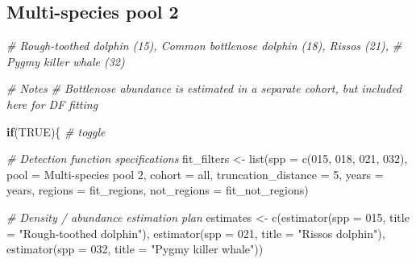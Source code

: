 \documentclass[
]{book}
\newenvironment{Shaded}{\begin{snugshade}}{\end{snugshade}}
\newcommand{\AttributeTok}[1]{\textcolor[rgb]{0.77,0.63,0.00}{#1}}
\newcommand{\CommentTok}[1]{\textcolor[rgb]{0.56,0.35,0.01}{\textit{#1}}}
\newcommand{\ConstantTok}[1]{\textcolor[rgb]{0.00,0.00,0.00}{#1}}
\newcommand{\ControlFlowTok}[1]{\textcolor[rgb]{0.13,0.29,0.53}{\textbf{#1}}}
\newcommand{\DecValTok}[1]{\textcolor[rgb]{0.00,0.00,0.81}{#1}}
\newcommand{\FunctionTok}[1]{\textcolor[rgb]{0.00,0.00,0.00}{#1}}
\newcommand{\NormalTok}[1]{#1}
\newcommand{\OtherTok}[1]{\textcolor[rgb]{0.56,0.35,0.01}{#1}}
\newcommand{\StringTok}[1]{\textcolor[rgb]{0.31,0.60,0.02}{#1}}
\begin{document}
\hypertarget{multi-species-pool-2}{%
\subsection*{Multi-species pool 2}\label{multi-species-pool-2}}

\begin{Shaded}
\begin{Highlighting}[]
\CommentTok{\# Rough{-}toothed dolphin (15), Common bottlenose dolphin (18), Risso\textquotesingle{}s (21),}
\CommentTok{\# Pygmy killer whale (32)}

\CommentTok{\# Notes}
\CommentTok{\# Bottlenose abundance is estimated in a separate cohort, but included here for DF fitting}

\ControlFlowTok{if}\NormalTok{(}\ConstantTok{TRUE}\NormalTok{)\{ }\CommentTok{\# toggle}

  \CommentTok{\# Detection function specifications}
\NormalTok{  fit\_filters }\OtherTok{\textless{}{-}}
    \FunctionTok{list}\NormalTok{(}\AttributeTok{spp =} \FunctionTok{c}\NormalTok{(}\StringTok{\textquotesingle{}015\textquotesingle{}}\NormalTok{, }\StringTok{\textquotesingle{}018\textquotesingle{}}\NormalTok{, }\StringTok{\textquotesingle{}021\textquotesingle{}}\NormalTok{, }\StringTok{\textquotesingle{}032\textquotesingle{}}\NormalTok{),}
         \AttributeTok{pool =} \StringTok{\textquotesingle{}Multi{-}species pool 2\textquotesingle{}}\NormalTok{,}
         \AttributeTok{cohort =} \StringTok{\textquotesingle{}all\textquotesingle{}}\NormalTok{,}
         \AttributeTok{truncation\_distance =} \DecValTok{5}\NormalTok{,}
         \AttributeTok{years =}\NormalTok{ years,}
         \AttributeTok{regions =}\NormalTok{ fit\_regions,}
         \AttributeTok{not\_regions =}\NormalTok{ fit\_not\_regions)}

  \CommentTok{\# Density / abundance estimation plan}
\NormalTok{  estimates }\OtherTok{\textless{}{-}}
      \FunctionTok{c}\NormalTok{(}\FunctionTok{estimator}\NormalTok{(}\AttributeTok{spp =} \StringTok{\textquotesingle{}015\textquotesingle{}}\NormalTok{, }\AttributeTok{title =} \StringTok{"Rough{-}toothed dolphin"}\NormalTok{),}
        \FunctionTok{estimator}\NormalTok{(}\AttributeTok{spp =} \StringTok{\textquotesingle{}021\textquotesingle{}}\NormalTok{, }\AttributeTok{title =} \StringTok{"Risso\textquotesingle{}s dolphin"}\NormalTok{),}
        \FunctionTok{estimator}\NormalTok{(}\AttributeTok{spp =} \StringTok{\textquotesingle{}032\textquotesingle{}}\NormalTok{, }\AttributeTok{title =} \StringTok{"Pygmy killer whale"}\NormalTok{))}


\end{Highlighting}
\end{Shaded}
\end{document}
